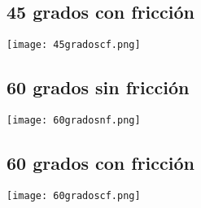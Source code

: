 \documentclass[10pt]{article}
\begin{document}
\subsection{45 grados con fricción}
\begin{center}
   \texttt{[image: 45gradoscf.png]}
\end{center}


\subsection{60 grados sin fricción}
\begin{center}
   \texttt{[image: 60gradosnf.png]}
\end{center}

\subsection{60 grados con fricción}
\begin{center}
   \texttt{[image: 60gradoscf.png]}
\end{center}



\end{document}
